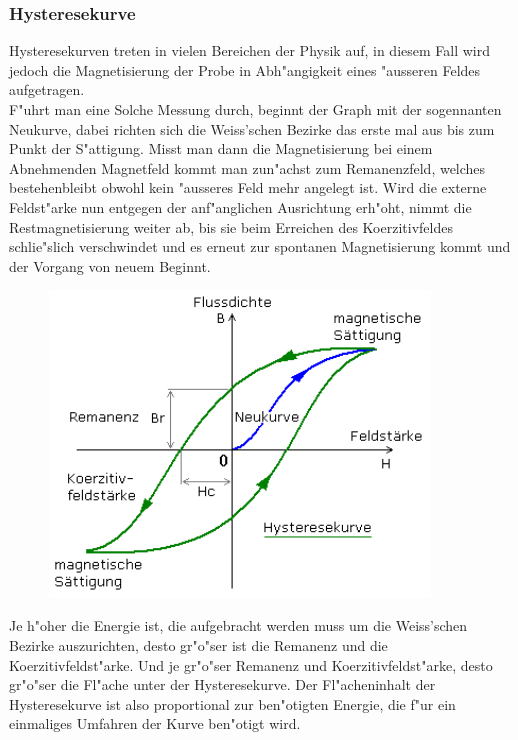         \subsubsection*{Hysteresekurve}
            Hysteresekurven treten in vielen Bereichen der Physik auf, in diesem Fall wird jedoch die Magnetisierung
            der Probe in Abh"angigkeit eines "ausseren Feldes aufgetragen.\\
            F"uhrt man eine Solche Messung durch, beginnt der Graph mit der sogennanten Neukurve, dabei richten sich
            die Weiss'schen Bezirke das erste mal aus bis zum Punkt der S"attigung. Misst man dann die Magnetisierung bei einem Abnehmenden Magnetfeld
            kommt man zun"achst zum Remanenzfeld, welches bestehenbleibt obwohl kein "ausseres Feld mehr angelegt ist. Wird die externe Feldst"arke nun entgegen der anf"anglichen Ausrichtung erh"oht, nimmt die Restmagnetisierung weiter ab, bis
            sie beim Erreichen des Koerzitivfeldes schlie"slich verschwindet und es erneut zur spontanen Magnetisierung kommt und der Vorgang von neuem Beginnt.
            \begin{figure}[H]
                \centering
                \includegraphics[width=0.9\textwidth]{Images/hyster.png}
            \end{figure}

            Je h"oher die Energie ist, die aufgebracht werden muss um die Weiss'schen Bezirke auszurichten, desto gr"o"ser ist die
            Remanenz und die Koerzitivfeldst"arke. Und je gr"o"ser Remanenz und Koerzitivfeldst"arke, desto gr"o"ser die Fl"ache unter der Hysteresekurve.
            Der Fl"acheninhalt der Hysteresekurve ist also proportional zur ben"otigten Energie, die f"ur ein einmaliges Umfahren der Kurve ben"otigt wird.
            
